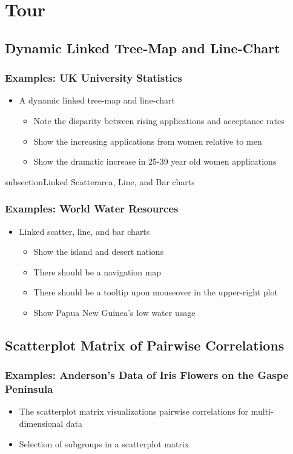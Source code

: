 \documentclass{beamer}
\begin{document}
\section{Tour}


\subsection{Dynamic Linked Tree-Map and Line-Chart}

\begin{frame}
\frametitle{Examples: UK University Statistics}
\begin{itemize}
\item A dynamic linked tree-map and line-chart
    \begin{itemize}
    \item Note the disparity between rising applications and acceptance rates
    \item Show the increasing applications from women relative to men
    \item Show the dramatic increase in 25-39 year old women applications
    \end{itemize}
\end{itemize}
\end{frame}


subsection{Linked Scatter\/area, Line, and Bar charts}

\begin{frame}
\frametitle{Examples: World Water Resources}
\begin{itemize}
\item Linked scatter, line, and bar charts
    \begin{itemize}
    \item Show the island and desert nations
    \item There should be a navigation map
    \item There should be a tooltip upon mouseover in the upper-right plot
    \item Show Papua New Guinea's low water usage
    \end{itemize}
\end{itemize}
\end{frame}


\subsection{Scatterplot Matrix of Pairwise Correlations}


\begin{frame}
\frametitle{Examples: Anderson's Data of Iris Flowers on the Gaspe Peninsula}
\begin{itemize}
\item The scatterplot matrix visualizations pairwise correlations for multi-dimensional data
\item Selection of subgroups in a scatterplot matrix
\end{itemize}
\end{frame}
\end{document}
